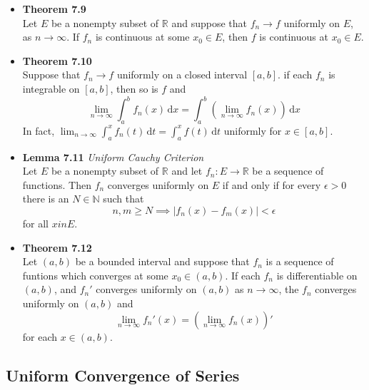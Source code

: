 \documentclass[11pt,a4paper]{article}
\begin{document}
\begin{itemize}
    \item \textbf{Theorem 7.9} \\
        Let $E$ be a nonempty subset of $\mathbb{R}$ and suppose that $f_n \to f$ uniformly
        on $E$, as $n \to \infty$.
        If $f_n$ is continuous at some $x_0 \in E$, then $f$ is continuous at $x_0 \in E$.

    \item \textbf{Theorem 7.10} \\
        Suppose that $f_n \to f$ uniformly on a closed interval $[a, b]$.
        if each $f_n$ is integrable on $[a, b]$, then so is $f$ and
        \[
            \lim_{n \to \infty} \int_a^b f_n(x)\, \mathrm{d}x =
            \int_a^b \left( \lim_{n \to \infty} f_n(x)\right)\, \mathrm{d}x
        \]
        In fact, $\lim_{n \to \infty} \int_a^x f_n(t)\, \mathrm{d}t =
        \int_a^x f(t)\, \mathrm{d}t$ uniformly for $x \in [a, b]$.

    \item \textbf{Lemma 7.11} \emph{Uniform Cauchy Criterion} \\
        Let $E$ be a nonempty subset of $\mathbb{R}$ and let $f_n : E \to \mathbb{R}$ be
        a sequence of functions.
        Then $f_n$ converges uniformly on $E$ if and only if for every $\epsilon > 0$
        there is an $N \in \mathbb{N}$ such that
        \[
            n, m \geq N \implies |f_n(x) - f_m(x)| < \epsilon
        \]
        for all $x in E$.

    \item \textbf{Theorem 7.12} \\
        Let $(a, b)$ be a bounded interval and suppose that $f_n$ is a sequence of funtions
        which converges at some $x_0 \in (a, b)$.
        If each $f_n$ is differentiable on $(a, b)$, and $f_n'$ converges uniformly on
        $(a, b)$ as $n \to \infty$, the $f_n$ converges uniformly on $(a, b)$ and
        \[
            \lim_{n \to \infty} f_n'(x) = \left( \lim_{n \to \infty} f_n(x) \right)'
        \]
        for each $x \in (a, b)$.

\end{itemize}

\subsection{Uniform Convergence of Series}
\end{document}
